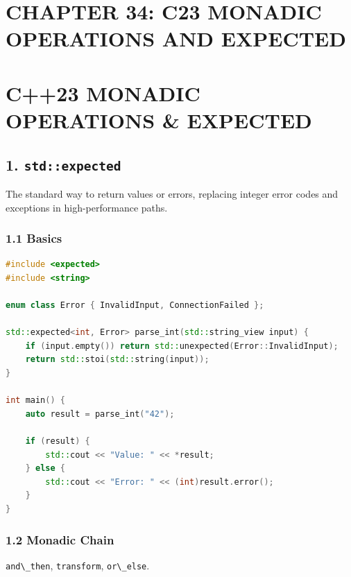 \hypertarget{chapter-34-c23-monadic-operations-and-expected}{%
\section{CHAPTER 34: C23 MONADIC OPERATIONS AND
EXPECTED}\label{chapter-34-c23-monadic-operations-and-expected}}

\hypertarget{c23-monadic-operations-expected}{%
\section{C++23 MONADIC OPERATIONS \&
EXPECTED}\label{c23-monadic-operations-expected}}

\hypertarget{stdexpected}{%
\subsection{\texorpdfstring{1.
\texttt{std::expected}}{1. std::expected}}\label{stdexpected}}

The standard way to return values or errors, replacing integer error
codes and exceptions in high-performance paths.

\hypertarget{basics}{%
\subsubsection{1.1 Basics}\label{basics}}

\begin{lstlisting}[language={C++}]
#include <expected>
#include <string>

enum class Error { InvalidInput, ConnectionFailed };

std::expected<int, Error> parse_int(std::string_view input) {
    if (input.empty()) return std::unexpected(Error::InvalidInput);
    return std::stoi(std::string(input));
}

int main() {
    auto result = parse_int("42");

    if (result) {
        std::cout << "Value: " << *result;
    } else {
        std::cout << "Error: " << (int)result.error();
    }
}
\end{lstlisting}

\hypertarget{monadic-chain}{%
\subsubsection{1.2 Monadic Chain}\label{monadic-chain}}

\passthrough{\lstinline!and\_then!},
\passthrough{\lstinline!transform!}, \passthrough{\lstinline!or\_else!}.

